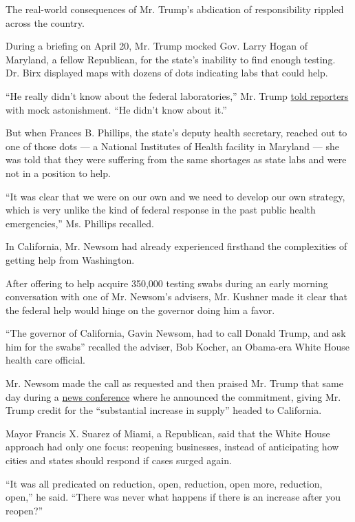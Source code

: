 The real-world consequences of Mr. Trump's abdication of responsibility
rippled across the country.

During a briefing on April 20, Mr. Trump mocked Gov. Larry Hogan of
Maryland, a fellow Republican, for the state's inability to find enough
testing. Dr. Birx displayed maps with dozens of dots indicating labs
that could help.

``He really didn't know about the federal laboratories,'' Mr. Trump
\href{https://www.whitehouse.gov/briefings-statements/remarks-president-trump-vice-president-pence-members-coronavirus-task-force-press-briefing-29/}{told
reporters} with mock astonishment. ``He didn't know about it.''

But when Frances B. Phillips, the state's deputy health secretary,
reached out to one of those dots --- a National Institutes of Health
facility in Maryland --- she was told that they were suffering from the
same shortages as state labs and were not in a position to help.

``It was clear that we were on our own and we need to develop our own
strategy, which is very unlike the kind of federal response in the past
public health emergencies,'' Ms. Phillips recalled.

In California, Mr. Newsom had already experienced firsthand the
complexities of getting help from Washington.

After offering to help acquire 350,000 testing swabs during an early
morning conversation with one of Mr. Newsom's advisers, Mr. Kushner made
it clear that the federal help would hinge on the governor doing him a
favor.

``The governor of California, Gavin Newsom, had to call Donald Trump,
and ask him for the swabs'' recalled the adviser, Bob Kocher, an
Obama-era White House health care official.

Mr. Newsom made the call as requested and then praised Mr. Trump that
same day during a
\href{https://www.facebookcorewwwi.onion/CAgovernor/videos/686605895491026/}{news
conference} where he announced the commitment, giving Mr. Trump credit
for the ``substantial increase in supply'' headed to California.

Mayor Francis X. Suarez of Miami, a Republican, said that the White
House approach had only one focus: reopening businesses, instead of
anticipating how cities and states should respond if cases surged again.

``It was all predicated on reduction, open, reduction, open more,
reduction, open,'' he said. ``There was never what happens if there is
an increase after you reopen?''

